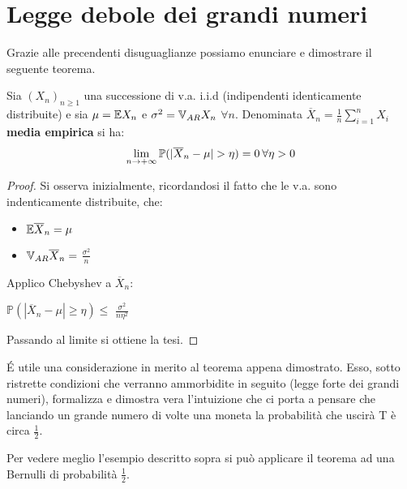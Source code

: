 \newpage

\section{Legge debole dei grandi numeri}

Grazie alle precendenti disuguaglianze possiamo enunciare e dimostrare il seguente teorema.

\vspace{5px}
\newcommand{\xn}{\overline{X}_n}

\begin{theorem}
Sia $(X_n)_{n\geq 1}$ una successione di v.a. i.i.d (indipendenti identicamente distribuite) e sia $\mu=\mathbb{E} X_n$ e $\sigma^2=\mathbb{V}_{AR} X_n$ \hspace{2px} $\forall n$. 
\newline 
\noindent
Denominata $\overline{X}_n=\frac{1}{n}\sum\limits_{i=1}^nX_i$ \textbf{media empirica} si ha:
    \[\lim_{n\to+\infty}\mathbb{P}(|\overline{X}_n-\mu|>\eta)=0 \hspace{2px} \forall\eta>0\]
\vspace{5px}
\begin{proof}
Si osserva inizialmente, ricordandosi il fatto che le v.a. sono indenticamente distribuite, che:
\begin{itemize}
    \item $\mathbb{E}\overline{X}_n=\mu$
    \item $\mathbb{V}_{AR}\overline{X}_n=$ {\large$\frac{\sigma^2}{n}$}
\end{itemize}
Applico Chebyshev a $\xn$:
\begin{center}
    $\mathbb{P}(|\xn-\mu|\geq\eta)\leq$ {\large$\frac{\sigma^2}{n\eta^2}$}
\end{center}
Passando al limite si ottiene la tesi.
\end{proof}
\end{theorem}

\vspace{10px}

\'E utile una considerazione in merito al teorema appena dimostrato. Esso, sotto ristrette condizioni che verranno ammorbidite in seguito (legge forte dei grandi numeri), formalizza e dimostra vera l'intuizione che ci porta a pensare che lanciando un grande numero di volte una moneta la probabilità che uscirà T è circa $\frac{1}{2}$. 

Per vedere meglio l'esempio descritto sopra si può applicare il teorema ad una Bernulli di probabilità $\frac{1}{2}$. 